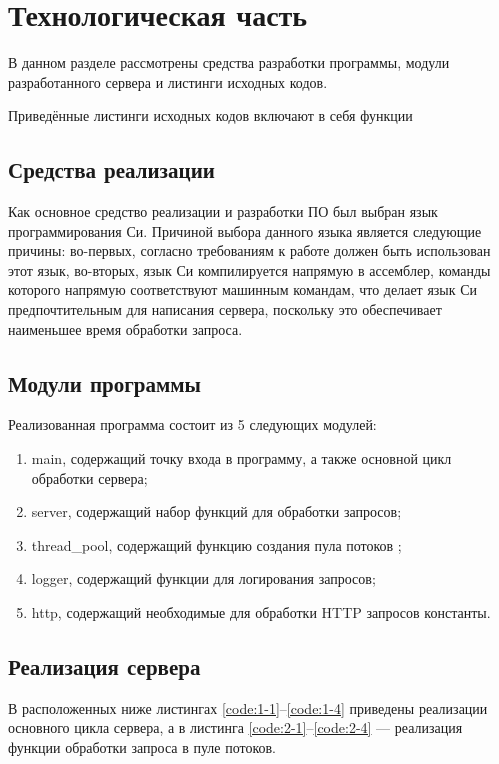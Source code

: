 \section{\large Технологическая часть}

В  данном  разделе  рассмотрены  средства  разработки  программы,  модули разработанного сервера и листинги исходных кодов.

Приведённые листинги исходных кодов включают в себя функции 

\subsection{Средства реализации}
Как  основное  средство  реализации  и  разработки  ПО  был  выбран  язык
программирования  Си.
Причиной  выбора  данного  языка  является следующие причины: во-первых, согласно требованиям к работе должен быть использован этот язык, во-вторых, язык Си компилируется напрямую в ассемблер, команды которого напрямую соответствуют машинным командам, что делает язык Си предпочтительным для написания сервера, поскольку это обеспечивает наименьшее время обработки запроса.

\subsection{Модули программы}

Реализованная программа состоит из 5 следующих модулей:
\begin{enumerate}[label=\arabic*)]
	\item main, содержащий точку входа в программу, а также основной цикл обработки сервера;
	\item server, содержащий набор функций для обработки запросов;
	\item thread\_pool, содержащий функцию создания пула потоков ;
	\item logger, содержащий функции для логирования запросов;
	\item http, содержащий необходимые для обработки HTTP запросов константы.
\end{enumerate}

\subsection{Реализация сервера}

В  расположенных  ниже  листингах \ref{code:1-1}--\ref{code:1-4} приведены реализации основного цикла сервера, а в листинга \ref{code:2-1}--\ref{code:2-4} --- реализация функции обработки запроса в пуле потоков.

